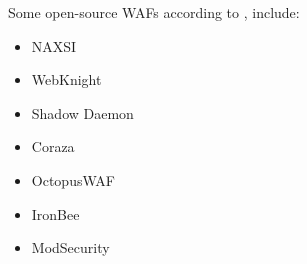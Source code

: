 Some open-source WAFs according to \cite{OSWAFS}, include:
\begin{itemize}
    \item NAXSI
    \item WebKnight
    \item Shadow Daemon
    \item Coraza
    \item OctopusWAF
    \item IronBee
    \item ModSecurity
\end{itemize}

\pendsign








